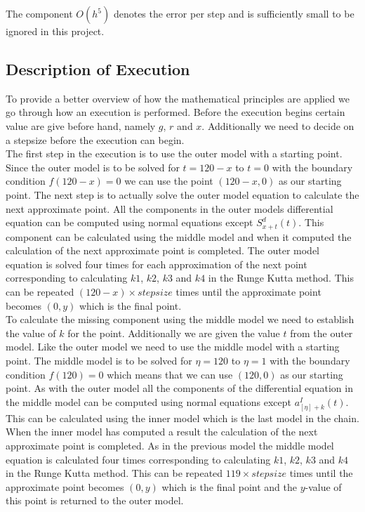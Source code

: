 The component $O(h^5)$ denotes the error per step and is sufficiently small to be ignored in this project.

\subsection{Description of Execution}
	To provide a better overview of how the mathematical principles are applied we go through how an execution is performed. Before the execution begins certain value are give before hand, namely $g$, $r$ and $x$. Additionally we need to decide on a stepsize before the execution can begin. \\
	
	The first step in the execution is to use the outer model with a starting point. Since the outer model is to be solved for $t=120-x$ to $t=0$ with the boundary condition $f(120-x)=0$ we can use the point $(120-x, 0)$ as our starting point. The next step is to actually solve the outer model equation to calculate the next approximate point. All the components in the outer models differential equation can be computed using normal equations except $S_{x+t}^d (t)$. This component can be calculated using the middle model and when it computed the calculation of the next approximate point is completed. The outer model equation is solved four times for each approximation of the next point corresponding to calculating $k1$, $k2$, $k3$ and $k4$ in the Runge Kutta method. This can be repeated $(120-x) \times stepsize$ times until the approximate point becomes $(0,y)$ which is the final point. \\
	
	To calculate the missing component using the middle model we need to establish the value of $k$ for the point. Additionally we are given the value $t$ from the outer model. Like the outer model we need to use the middle model with a starting point. The middle model is to be solved for $\eta = 120$ to $\eta = 1$ with the boundary condition $f(120) = 0$ which means that we can use $(120,0)$ as our starting point. As with the outer model all the components of the differential equation in the middle model can be computed using normal equations except $a_{[\eta]+k}^I(t)$. This can be calculated using the inner model which is the last model in the chain. When the inner model has computed a result the calculation of the next approximate point is completed. As in the previous model the middle model equation is calculated four times corresponding to calculating $k1$, $k2$, $k3$ and $k4$ in the Runge Kutta method. This can be repeated $119 \times stepsize$ times until the approximate point becomes $(0,y)$ which is the final point and the $y$-value of this point is returned to the outer model. \\
	
